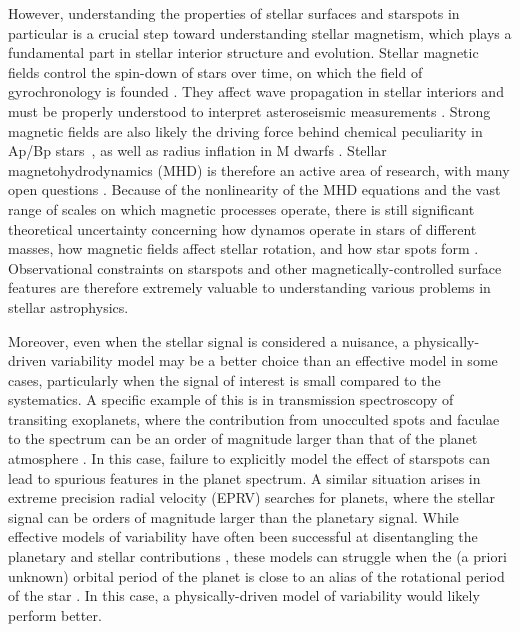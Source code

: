 \documentclass[modern,linenumbers]{aastex62}
\begin{document}
However, understanding the properties of stellar surfaces and starspots
in particular is a crucial step
toward understanding stellar magnetism, which plays a fundamental part
in stellar interior structure and evolution. Stellar magnetic fields
control the spin-down of stars over time, on which the field of
gyrochronology is founded \citep[][]{Barnes2001,Angus2019}. They affect
wave propagation in stellar interiors and must be properly
understood to interpret asteroseismic measurements \citep[e.g.,][]{Fuller2015}.
Strong magnetic fields are also likely the driving force behind chemical
peculiarity in Ap/Bp stars~\citep{Turcotte2003,Sikora2018}, as well as
radius inflation in M dwarfs \citep{Gough1966,Ireland2018}.
Stellar magnetohydrodynamics (MHD) is therefore an active area of
research, with many open questions \citep[e.g.,][]{Miesch2009}.
%
Because of the nonlinearity of the MHD equations and the vast range
of scales on which magnetic processes operate,
there is still significant theoretical uncertainty concerning how dynamos
operate in stars of different masses, how magnetic fields affect stellar rotation,
and how star spots form \citep{Yadav2015,Weber2016}.
Observational constraints on starspots and other magnetically-controlled
surface features are therefore extremely valuable to understanding various problems in
stellar astrophysics.

Moreover, even when the stellar signal is considered a nuisance, a
physically-driven variability model may be a better choice than an
effective model in some cases, particularly when the signal of interest is small
compared to the systematics. A specific example of this is in transmission
spectroscopy of transiting exoplanets, where the contribution from
unocculted spots and faculae to the spectrum
can be an order of magnitude larger than that of the planet atmosphere
\citep{Rackham2018}. In this case, failure to explicitly model the effect of starspots
can lead to spurious features in the planet spectrum.
%
A similar situation arises in extreme precision radial velocity (EPRV)
searches for planets, where the stellar signal can be orders of magnitude
larger than the planetary signal. While effective models of
variability have often been successful at disentangling the planetary
and stellar contributions \citep[e.g.,][]{Rajpaul2015}, these models can struggle
when the (a priori unknown) orbital period of the planet
is close to an alias of the rotational period of the star \citep{Vanderburg2016,Damasso2019,Robertson2020}.
In this case, a physically-driven model of variability would likely
perform better.
\end{document}
